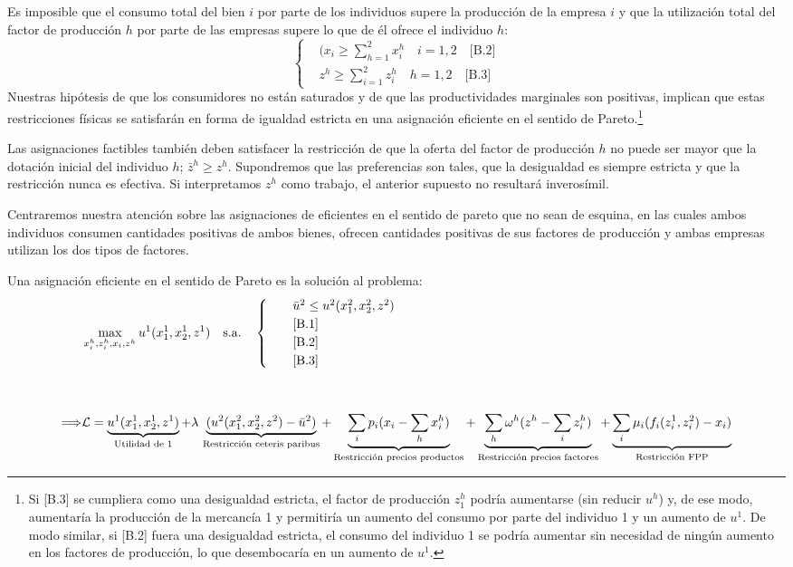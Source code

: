 \documentclass[10pt,a4paper]{article}
\begin{document}
Es imposible que el consumo total del bien $i$ por parte de los individuos supere la producción de la empresa $i$ y que la utilización total del factor de producción $h$ por parte de las empresas supere lo que de él ofrece el individuo $h$:
$$
\left\{\begin{aligned}
    &(x_i\ge\sum_{h=1}^2x_i^h\quad i=1,2 \quad \text{[B.2]}\\[0.5em]
    &z^h\ge\sum_{i=1}^2z_i^h\quad h=1,2\quad\text{[B.3]}
\end{aligned}\right.
$$
Nuestras hipótesis de que los consumidores no están saturados y de que las productividades marginales son positivas, implican que estas restricciones físicas se satisfarán en forma de igualdad estricta en una asignación eficiente en el sentido de Pareto.\footnote{%
    Si [B.3] se cumpliera como una desigualdad estricta, el factor de producción $z_1^h$ podría aumentarse (sin reducir $u^h$) y, de ese modo, aumentaría la producción de la mercancía 1 y permitiría un aumento del consumo por parte del individuo 1 y un aumento de $u^1$. De modo similar, si [B.2] fuera una desigualdad estricta, el consumo del individuo 1 se podría aumentar sin necesidad de ningún aumento en los factores de producción, lo que desembocaría en un aumento de $u^1$.
} 

Las asignaciones factibles también deben satisfacer la restricción de que la oferta del factor de producción $h$ no puede ser mayor que la dotación inicial del individuo $h$; $\bar{z}^h\ge z^h$. Supondremos que las preferencias son tales, que la desigualdad es siempre estricta y que la restricción nunca es efectiva. Si interpretamos $z^h$ como trabajo, el anterior supuesto no resultará inverosímil. 

Centraremos nuestra atención sobre las asignaciones de eficientes en el sentido de pareto que no sean de esquina, en las cuales ambos individuos consumen cantidades positivas de ambos bienes, ofrecen cantidades positivas de sus factores de producción y ambas empresas utilizan los dos tipos de factores.

Una asignación eficiente en el sentido de Pareto es la solución al problema:
$$
\begin{aligned}
    &\max_{x_i^h,z_i^h,x_i,z^h} {u^1(x_1^1,x_2^1,z^1)}\quad \text{s.a.}\quad 
        \begin{cases}
            \quad &\bar{u}^2\leq u^2 (x_1^2,x_2^2,z^2)\\
            \quad &\text{[B.1]}\\
            \quad &\text{[B.2]}\\
            \quad &\text{[B.3]}
        \end{cases}
        \\[3em]
\Longrightarrow&\mathcal{L}
= \underbrace{u^1(x_1^1,x_2^1,z^1)}_{\text{\scriptsize Utilidad de 1}}
+ \lambda\,\underbrace{(u^2(x_1^2,x_2^2,z^2)-\bar{u}^2)}_{\text{\scriptsize Restricción ceteris paribus}}
+ \underbrace{\sum_i p_i (x_i-\sum_h x_i^h)}_{\text{\scriptsize Restricción precios productos}}
+ \underbrace{\sum_h \omega^h (z^h-\sum_i z_i^h)}_{\text{\scriptsize Restricción precios factores}}
+ \underbrace{\sum_i \mu_i (f_i(z_i^1,z_i^2)-x_i)}_{\text{\scriptsize Restricción FPP}}
\end{aligned}
$$
\end{document}
